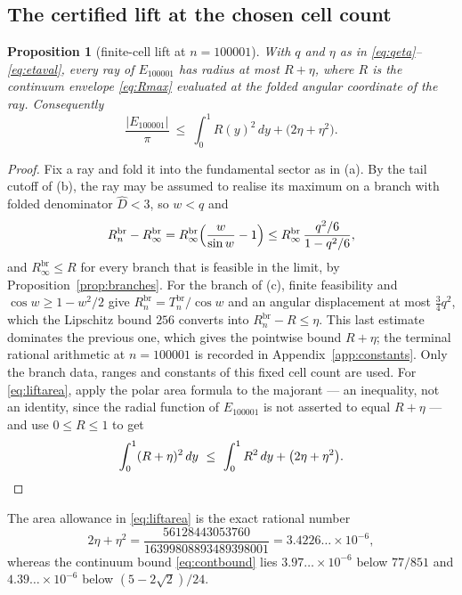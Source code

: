 \documentclass[11pt]{article}
\theoremstyle{plain}
\newtheorem{proposition}[theorem]{Proposition}
\theoremstyle{definition}
\theoremstyle{remark}
\begin{document}
\subsection{The certified lift at the chosen cell count}

\begin{proposition}[finite-cell lift at $n=100001$]\label{prop:lift}
With $q$ and $\eta$ as in \eqref{eq:qeta}--\eqref{eq:etaval}, every ray of
$E_{100001}$ has radius at most $R+\eta$, where $R$ is the continuum envelope
\eqref{eq:Rmax} evaluated at the folded angular coordinate of the ray.
Consequently
\begin{equation}\label{eq:liftarea}
  \frac{|E_{100001}|}{\pi}
  \ \le\ \int_{0}^{1}R(y)^{2}\,dy+\bigl(2\eta+\eta^{2}\bigr).
\end{equation}
\end{proposition}

\begin{proof}
Fix a ray and fold it into the fundamental sector as in (a). By the tail cutoff
of (b), the ray may be assumed to realise its maximum on a branch with folded
denominator $\widehat D<3$, so $w<q$ and
\[
  R^{\mathrm{br}}_{n}-R^{\mathrm{br}}_{\infty}
  =R^{\mathrm{br}}_{\infty}\Bigl(\frac{w}{\sin w}-1\Bigr)
  \le R^{\mathrm{br}}_{\infty}\,\frac{q^{2}/6}{1-q^{2}/6},
\]
and $R^{\mathrm{br}}_{\infty}\le R$ for every branch that is feasible in the
limit, by Proposition~\ref{prop:branches}. For the branch of (c), finite
feasibility and $\cos w\ge1-w^{2}/2$ give
$R^{\mathrm{br}}_{n}=T^{\mathrm{br}}_{n}/\cos w$ and an angular displacement at
most $\tfrac34q^{2}$, which the Lipschitz bound $256$ converts into
$R^{\mathrm{br}}_{n}-R\le\eta$. This last estimate dominates the previous one,
which gives the pointwise bound $R+\eta$; the terminal rational arithmetic at
$n=100001$ is recorded in Appendix~\ref{app:constants}. Only the branch data,
ranges and constants of this fixed cell count are used. For
\eqref{eq:liftarea}, apply the polar area formula to the majorant --- an
inequality, not an identity, since the radial function of $E_{100001}$ is not
asserted to equal $R+\eta$ --- and use $0\le R\le1$ to get
\[
  \int_{0}^{1}(R+\eta)^{2}\,dy
  \ \le\ \int_{0}^{1}R^{2}\,dy+\bigl(2\eta+\eta^{2}\bigr). \qedhere
\]
\end{proof}

The area allowance in \eqref{eq:liftarea} is the exact rational number
\begin{equation}\label{eq:areaerror}
  2\eta+\eta^{2}
  =\frac{56128443053760}{16399808893489398001}
  =3.4226\ldots\times10^{-6},
\end{equation}
whereas the continuum bound \eqref{eq:contbound} lies
$3.97\ldots\times10^{-6}$ below $77/851$ and
$4.39\ldots\times10^{-6}$ below $(5-2\sqrt2)/24$.
\end{document}
